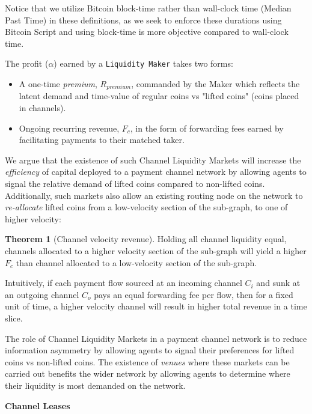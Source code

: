 \documentclass[10pt,a4paper]{article}
\theoremstyle{definition}
\newtheorem{theorem}{Theorem}[section]
\begin{document}
Notice that we utilize Bitcoin block-time rather than wall-clock time (Median Past
Time) \cite{bip113} in these definitions, as we seek to enforce these durations using
Bitcoin Script and using block-time is more objective compared to wall-clock time.

The profit ($\alpha$) earned by a \texttt{Liquidity Maker} takes two forms:
\begin{itemize}
   \item A one-time \emph{premium}, $R_{premium}$, commanded by the Maker which
       reflects the latent demand and time-value of regular coins vs "lifted
       coins" (coins placed in channels).

   \item Ongoing recurring revenue, $F_c$,  in the form of forwarding fees
       earned by facilitating payments to their matched taker.
\end{itemize}


We argue that the existence of such Channel Liquidity Markets will increase the
\emph{efficiency} of capital deployed to a payment channel network by allowing
agents to signal the relative demand of lifted coins compared to non-lifted
coins. Additionally, such markets also allow an existing routing node on the
network to \emph{re-allocate} lifted coins from a low-velocity section of the
sub-graph, to one of higher velocity:

\begin{theorem}[Channel velocity revenue] %
Holding all channel liquidity equal, channels allocated to a higher velocity
section of the sub-graph will yield a higher $F_c$  than channel allocated to a
low-velocity section of the sub-graph.
\end{theorem}

Intuitively, if each payment flow sourced at an incoming channel $C_i$ and sunk
at an outgoing channel $C_o$ pays an equal forwarding fee per flow, then for a
fixed unit of time, a higher velocity channel will result in higher total
revenue in a time slice.

The role of Channel Liquidity Markets in a payment channel network is to reduce
information asymmetry by allowing agents to signal their preferences for lifted
coins vs non-lifted coins. The existence of \emph{venues} where these markets
can be carried out benefits the wider network by allowing agents to determine
where their liquidity is most demanded on the network. %

\begin{center}
\textbf{Channel Leases}
\end{center}
\end{document}
